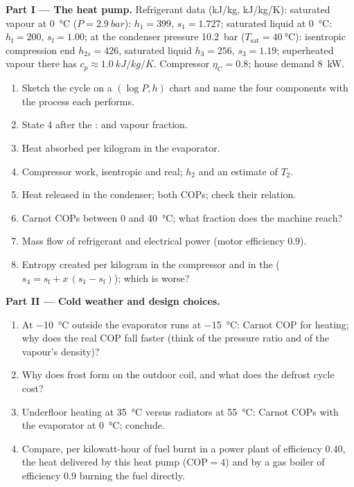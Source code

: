 \begin{problem}\label{pb:b2:open-systems:1}
\textbf{Part I --- The heat pump.}
Refrigerant data (\unit{kJ/kg}, \unit{kJ/kg/K}): saturated vapour at
\qty{0}{\celsius} ($P = \qty{2.9}{bar}$): $h_1 = 399$, $s_1 = 1.727$;
saturated liquid at \qty{0}{\celsius}: $h_{\text{f}} = 200$, $s_{\text{f}} = 1.00$;
at the condenser pressure \qty{10.2}{bar} ($T_{\text{sat}} = \qty{40}{\celsius}$):
isentropic compression end $h_{2s} = 426$, saturated liquid $h_3 = 256$,
$s_3 = 1.19$; superheated vapour there has $c_p \approx \qty{1.0}{kJ/kg/K}$.
Compressor $\eta_{\text{C}} = 0.8$; house demand \qty{8}{kW}.
\begin{enumerate}
  \item Sketch the cycle on a $(\log P, h)$ chart and name the four
        components with the process each performs.
  \item State 4 after the :  and vapour fraction.
  \item Heat absorbed per kilogram in the evaporator.
  \item Compressor work, isentropic and real; $h_2$ and an estimate of
        $T_2$.
  \item Heat released in the condenser; both COPs; check their
        relation.
  \item Carnot COPs between \qty{0}{} and \qty{40}{\celsius}; what
        fraction does the machine reach?
  \item Mass flow of refrigerant and electrical power (motor
        efficiency $0.9$).
  \item Entropy created per kilogram in the compressor and in the
         ($s_4 = s_{\text{f}} + x\,(s_1 - s_{\text{f}})$); which is
        worse?
\end{enumerate}

\textbf{Part II --- Cold weather and design choices.}
\begin{enumerate}[resume]
  \item At \qty{-10}{\celsius} outside the evaporator runs at
        \qty{-15}{\celsius}: Carnot COP for heating; why does the real
        COP fall faster (think of the pressure ratio and of the
        vapour's density)?
  \item Why does frost form on the outdoor coil, and what does the
        defrost cycle cost?
  \item Underfloor heating at \qty{35}{\celsius} versus radiators at
        \qty{55}{\celsius}: Carnot COPs with the evaporator at
        \qty{0}{\celsius}; conclude.
  \item Compare, per kilowatt-hour of fuel burnt in a power plant of
        efficiency $0.40$, the heat delivered by this heat pump ($\mathrm{COP}
        = 4$) and by a gas boiler of efficiency $0.9$ burning the fuel
        directly.
\end{enumerate}


\end{problem}
